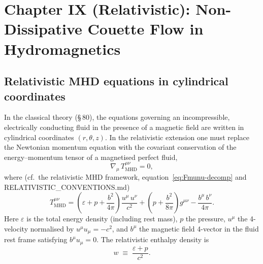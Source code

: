 %

\chapter*{Chapter IX (Relativistic): Non-Dissipative Couette Flow in
  Hydromagnetics}

\section{Relativistic MHD equations in cylindrical coordinates}
\label{sec:rel-9-80}

In the classical theory (\S\,80), the equations governing an
incompressible, electrically conducting fluid in the presence of a
magnetic field are written in cylindrical coordinates $(r,\theta,z)$.
In the relativistic extension one must replace the Newtonian momentum
equation with the covariant conservation of the energy--momentum
tensor of a magnetised perfect fluid,
\begin{equation}
  \nabla_{\mu}\, T^{\mu\nu}_{\mathrm{MHD}} = 0,
  \label{eq:rel-9-Tcons}
\end{equation}
where (cf.\ the relativistic MHD framework, equation~\eqref{eq:Fmunu-decomp}
and RELATIVISTIC\_CONVENTIONS.md)
\begin{equation}
  T^{\mu\nu}_{\mathrm{MHD}}
  = \left(\varepsilon + p + \frac{b^{2}}{4\pi}\right)
    \frac{u^{\mu}\,u^{\nu}}{c^{2}}
  + \left(p + \frac{b^{2}}{8\pi}\right)g^{\mu\nu}
  - \frac{b^{\mu}\,b^{\nu}}{4\pi}.
  \label{eq:rel-9-TMHD}
\end{equation}
Here $\varepsilon$ is the total energy density (including rest mass),
$p$ the pressure, $u^{\mu}$ the 4-velocity normalised by
$u^{\mu}u_{\mu}=-c^{2}$, and $b^{\mu}$ the magnetic field 4-vector in
the fluid rest frame satisfying $b^{\mu}u_{\mu}=0$.  The relativistic
enthalpy density is
\begin{equation}
  w \;\equiv\; \frac{\varepsilon + p}{c^{2}}.
  \label{eq:rel-9-enthalpy}
\end{equation}

